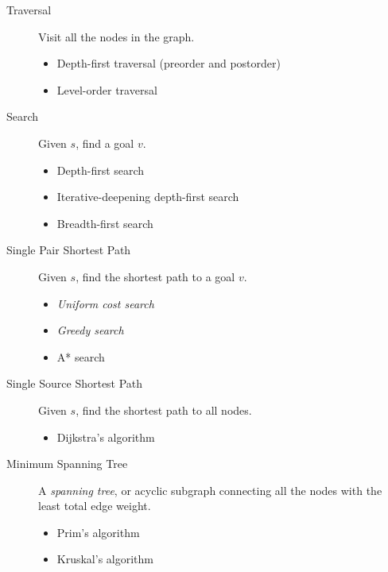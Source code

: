 \begin{blocksection}
\begin{description}
\item[Traversal] Visit all the nodes in the graph.
\begin{itemize}[$\cdot$]
\item Depth-first traversal (preorder and postorder)
\item Level-order traversal
\end{itemize}

\item[Search] Given $s$, find a goal $v$.
\begin{itemize}[$\cdot$]
\item Depth-first search
\item Iterative-deepening depth-first search
\item Breadth-first search
\end{itemize}

\item[Single Pair Shortest Path] Given $s$, find the shortest path to a
goal $v$.
\begin{itemize}[$\cdot$]
\item \emph{Uniform cost search}
\item \emph{Greedy search}
\item A* search
\end{itemize}

\item[Single Source Shortest Path] Given $s$, find the shortest path to all
nodes.
\begin{itemize}[$\cdot$]
\item Dijkstra's algorithm
\end{itemize}

\item[Minimum Spanning Tree] A \emph{spanning tree}, or acyclic subgraph
connecting all the nodes with the least total edge weight.
\begin{itemize}[$\cdot$]
\item Prim's algorithm
\item Kruskal's algorithm
\end{itemize}
\end{description}
\end{blocksection}
